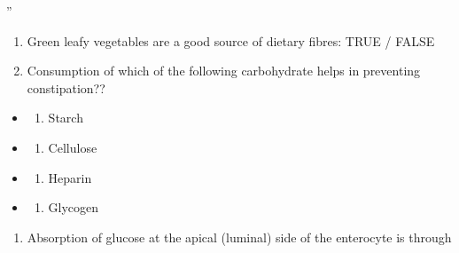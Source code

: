 \documentclass[
]{book}
\providecommand{\tightlist}{%
  \setlength{\itemsep}{0pt}\setlength{\parskip}{0pt}}
\begin{document}
''

\begin{enumerate}
\def\labelenumi{\arabic{enumi}.}
\setcounter{enumi}{1}
\item
  Green leafy vegetables are a good source of dietary fibres: TRUE / FALSE
\item
  Consumption of which of the following carbohydrate helps in preventing constipation??
\end{enumerate}

\begin{itemize}
\tightlist
\item
  \begin{enumerate}
  \def\labelenumi{(\Alph{enumi})}
  \tightlist
  \item
    Starch\\
  \end{enumerate}
\item
  \begin{enumerate}
  \def\labelenumi{(\Alph{enumi})}
  \setcounter{enumi}{1}
  \tightlist
  \item
    Cellulose\\
  \end{enumerate}
\item
  \begin{enumerate}
  \def\labelenumi{(\Alph{enumi})}
  \setcounter{enumi}{2}
  \tightlist
  \item
    Heparin\\
  \end{enumerate}
\item
  \begin{enumerate}
  \def\labelenumi{(\Alph{enumi})}
  \setcounter{enumi}{3}
  \tightlist
  \item
    Glycogen
  \end{enumerate}
\end{itemize}

\begin{enumerate}
\def\labelenumi{\arabic{enumi}.}
\setcounter{enumi}{3}
\tightlist
\item
  Absorption of glucose at the apical (luminal) side of the enterocyte is through
\end{enumerate}
\end{document}
